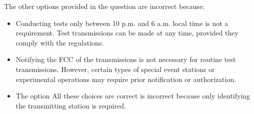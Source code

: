 The other options provided in the question are incorrect because:
\begin{itemize}
    \item Conducting tests only between 10 p.m. and 6 a.m. local time is not a requirement. Test transmissions can be made at any time, provided they comply with the regulations.
    \item Notifying the FCC of the transmissions is not necessary for routine test transmissions. However, certain types of special event stations or experimental operations may require prior notification or authorization.
    \item The option All these choices are correct is incorrect because only identifying the transmitting station is required.
\end{itemize}

